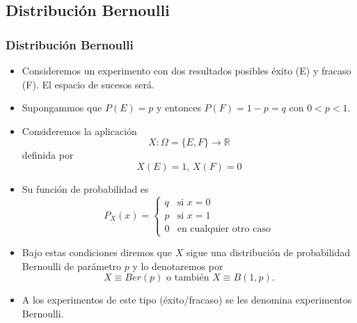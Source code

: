 \documentclass[handout]{beamer}
\newcommand{\RR}{\mathbb{R}}
\renewcommand{\leq}{\leqslant}
\theoremstyle{plain}
\theoremstyle{definition}
\begin{document}
\subsection{Distribución Bernoulli}
\begin{frame}
\frametitle{Distribución Bernoulli}
\begin{itemize}
\item Consideremos un experimento con dos resultados posibles éxito (E) y
fracaso (F). El espacio de sucesos será.
\item Supongammos  que  $P(E)=p$ y entonces $P(F)=1-p=q$ con $0<p<1$.
\item Consideremos la  aplicación 
$$X:\Omega=\{E,F\}\to \RR$$
definida por
$$X(E)=1\mbox{, }X(F)=0$$
\item Su  función de probabilidad es
$$
P_{X}(x)=
\left\{
\begin{array}{ll} q & \mbox{si } x=0\\
p & \mbox{si } x=1\\
0 & \mbox{en cualquier otro caso}
\end{array}
\right.
$$
\end{itemize}
\end{frame}


\begin{frame}[fragile]
\begin{itemize}
\item Bajo estas condiciones diremos que $X$ sigue una distribución de
probabilidad  Bernoulli de parámetro $p$ y lo denotaremos por
$$X\equiv Ber(p)\mbox{ o también } X\equiv B(1,p).$$
\item A los experimentos de este tipo (éxito/fracaso)
    se les denomina experimentos Bernoulli.
\end{itemize}
\end{frame}
% 
% 
% 
\end{document}
